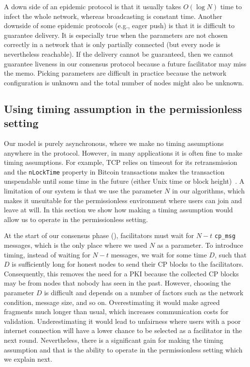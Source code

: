 A down side of an epidemic protocol is that it usually takes $O(\log N)$ time to infect the whole network,
whereas broadcasting is constant time.
Another downside of some epidemic protocols (e.g., eager push) is that it is difficult to guarantee delivery.
It is especially true when the parameters are not chosen correctly in a network that is only partially connected (but every node is nevertheless reachable).
If the delivery cannot be guaranteed, 
then we cannot guarantee liveness in our consensus protocol because a future facilitator may miss the memo.
Picking parameters are difficult in practice because the network configuration is unknown and the total number of nodes might also be unknown.


\subsection{Using timing assumption in the permissionless setting}
\label{sec:permissionless}
Our model is purely asynchronous, where we make no timing assumptions anywhere in the protocol.
However, in many applications it is often fine to make timing assumptions.
For example, TCP relies on timeout for its retransmission and the \texttt{nLockTime} property in Bitcoin transactions makes the transaction unspendable until some time in the future (either Unix time or block height)~\cite{bitcoindevguide}.
A limitation of our system is that we use the parameter $N$ in our algorithms, which makes it unsuitable for the permissionless environment where users can join and leave at will.
In this section we show how making a timing assumption would allow us to operate in the permissionless setting.

At the start of our consensus phase (), facilitators must wait for $N-t$ \texttt{cp\_msg} messages,
which is the only place where we used $N$ as a parameter.
To introduce timing, instead of waiting for $N-t$ messages, we wait for some time $D$,
such that $D$ is sufficiently long for honest nodes to send their CP blocks to the facilitators.
Consequently, this removes the need for a PKI because the collected CP blocks may be from nodes that nobody has seen in the past.
However, choosing the parameter $D$ is difficult and depends on a number of factors such as the network condition, message size, and so on.
Overestimating it would make agreed fragments much longer than usual, which increases communication costs for validation.
Underestimating it would lead to unfairness where users with a poor internet connection will have a lower chance to be selected as a facilitator in the next round.
Nevertheless, there is a significant gain for making the timing assumption and that is the ability to operate in the permissionless setting which we explain next.

